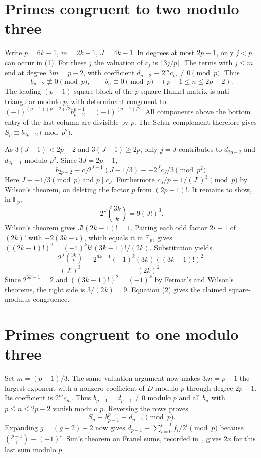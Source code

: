 \documentclass[11pt]{article}
\begin{document}
\section{Primes congruent to two modulo three}
Write $p=6k-1$, $m=2k-1$, $J=4k-1$. In degrees at most $2p-1$, only $j<p$ can occur in (1). For these $j$ the valuation of $c_j$ is $\lfloor3j/p\rfloor$. The terms with $j\le m$ end at degree $3m=p-2$, with coefficient
$d_{p-2}\equiv 2^m c_m\ne0\pmod p$. Thus
\[
 b_{p-2}\not\equiv0\pmod p,\qquad b_n\equiv0\pmod p\quad(p-1\le n\le 2p-2).
\]
The leading $(p-1)$-square block of the $p$-square Hankel matrix is anti-triangular modulo $p$, with determinant congruent to $(-1)^{(p-1)(p-2)/2}b_{p-2}^{p-1}=(-1)^{(p-1)/2}$. All components above the bottom entry of the last column are divisible by $p$. The Schur complement therefore gives $S_p\equiv b_{2p-2}\pmod{p^2}$.

As $3(J-1)<2p-2$ and $3(J+1)\ge2p$, only $j=J$ contributes to $d_{2p-2}$ and $d_{2p-1}$ modulo $p^2$. Since $3J=2p-1$,
\[
 b_{2p-2}\equiv c_J2^{J-1}(J-1/3)\equiv-2^Jc_J/3\pmod{p^2}.
\]
Here $J\equiv-1/3\pmod p$ and $p\mid c_J$. Furthermore $c_J/p\equiv1/(J!)^3\pmod p$ by Wilson's theorem, on deleting the factor $p$ from $(2p-1)!$. It remains to show, in $\mathbb F_p$,
\begin{equation}
 2^J\binom{3k}{k}=9(J!)^3.\tag{2}
\end{equation}
Wilson's theorem gives $J!(2k-1)!=1$. Pairing each odd factor $2i-1$ of $(2k)!$ with $-2(3k-i)$, which equals it in $\mathbb F_p$, gives $((2k-1)!)^2=(-4)^k k!(3k-1)!/(2k)$. Substitution yields
\[
 \frac{2^J\binom{3k}{k}}{(J!)^3}
 =\frac{2^{6k-1}(-1)^k(3k)((3k-1)!)^2}{(2k)^2}.
\]
Since $2^{6k-1}=2$ and $((3k-1)!)^2=(-1)^k$ by Fermat's and Wilson's theorems, the right side is $3/(2k)=9$. Equation (2) gives the claimed square-modulus congruence.

\section{Primes congruent to one modulo three}
Set $m=(p-1)/3$. The same valuation argument now makes $3m=p-1$ the largest exponent with a nonzero coefficient of $D$ modulo $p$ through degree $2p-1$. Its coefficient is $2^mc_m$. Thus $b_{p-1}=d_{p-1}\ne0$ modulo $p$ and all $b_n$ with $p\le n\le2p-2$ vanish modulo $p$. Reversing the rows proves
\[
 S_p\equiv b_{p-1}^p\equiv d_{p-1}\pmod p.
\]
Expanding $g=(g+2)-2$ now gives $d_{p-1}\equiv\sum_{i=0}^{p-1}f_i/2^i\pmod p$ because $\binom{p-1}{i}\equiv(-1)^i$. Sun's theorem on Franel sums, recorded in~\cite[eq.~(1.1)]{mao}, gives $2x$ for this last sum modulo $p$.
\end{document}
